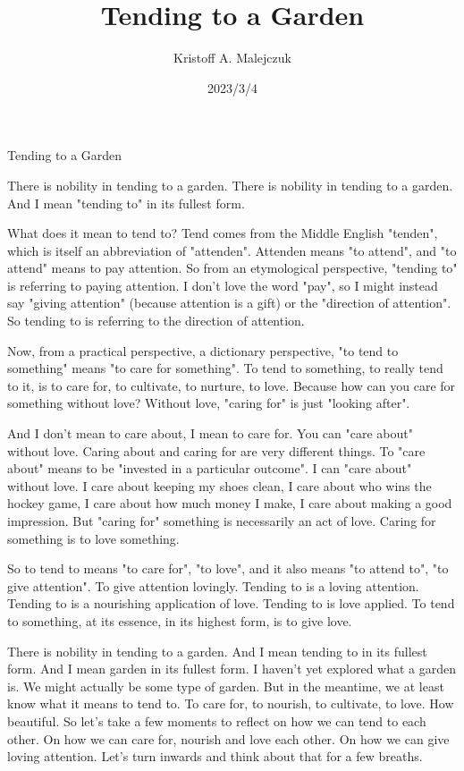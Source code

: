 \documentclass[11pt, oneside]{article}          %
\title{Tending to a Garden}
\author{Kristoff A. Malejczuk}
\date{2023/3/4}
\begin{document}
Tending to a Garden

There is nobility in tending to a garden.
There is nobility in tending to a garden.
And I mean "tending to" in its fullest form.

What does it mean to tend to?
Tend comes from the Middle English "tenden", which is itself an abbreviation of "attenden".
Attenden means "to attend", and "to attend" means to pay attention.
So from an etymological perspective, "tending to" is referring to paying attention.
I don't love the word "pay", so I might instead say "giving attention" (because attention is a gift) or the "direction of attention".
So tending to is referring to the direction of attention.

Now, from a practical perspective, a dictionary perspective, "to tend to something" means "to care for something".
To tend to something, to really tend to it, is to care for, to cultivate, to nurture, to love.
Because how can you care for something without love?
Without love, "caring for" is just "looking after".

And I don't mean to care about, I mean to care for.
You can "care about" without love.
Caring about and caring for are very different things.
To "care about" means to be "invested in a particular outcome".
I can "care about" without love.
I care about keeping my shoes clean, I care about who wins the hockey game, I care about how much money I make, I care about making a good impression.
But "caring for" something is necessarily an act of love.
Caring for something is to love something.

So to tend to means "to care for", "to love", and it also means "to attend to", "to give attention".
To give attention lovingly.
Tending to is a loving attention.
Tending to is a nourishing application of love.
Tending to is love applied.
To tend to something, at its essence, in its highest form, is to give love.

There is nobility in tending to a garden.
And I mean tending to in its fullest form.
And I mean garden in its fullest form.
I haven't yet explored what a garden is.
We might actually be some type of garden.
But in the meantime, we at least know what it means to tend to.
To care for, to nourish, to cultivate, to love.
How beautiful.
So let's take a few moments to reflect on how we can tend to each other.
On how we can care for, nourish and love each other.
On how we can give loving attention.
Let's turn inwards and think about that for a few breaths.







%
%
%
%
%
\end{document}
